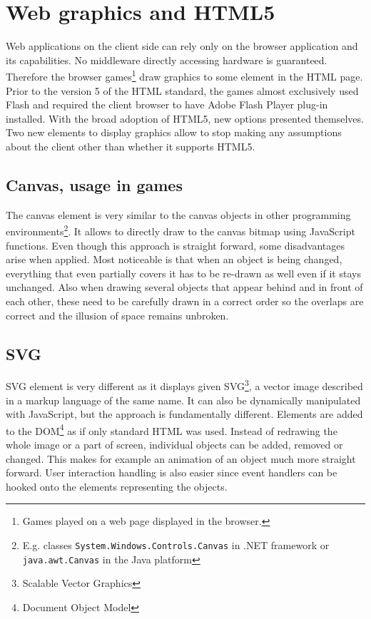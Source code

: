 \documentclass[11pt,oneside, final]{fithesis2}
\begin{document}
\section{Web graphics and HTML5}
Web applications on the client side can rely only on the browser application and its capabilities. No middleware directly accessing hardware is guaranteed. Therefore the browser games\footnote{Games played on a web page displayed in the browser.} draw graphics to some element in the HTML page. Prior to the version 5 of the HTML standard, the games almost exclusively used Flash and required the client browser to have Adobe Flash Player plug-in installed\cite{flashplayer}. With the broad adoption of HTML5, new options presented themselves. Two new elements to display graphics allow to stop making any assumptions about the client other than whether it supports HTML5.

\subsection{Canvas, usage in games}
The canvas element is very similar to the canvas objects in other programming environments\footnote{E.g. classes \texttt{System.Windows.Controls.Canvas} in .NET framework\cite{net_canvas} or \texttt{java.awt.Canvas} in the Java platform\cite{java_canvas}}. It allows to directly draw to the canvas bitmap using JavaScript functions. Even though this approach is straight forward, some disadvantages arise when applied. Most noticeable is that when an object is being changed, everything that even partially covers it has to be re-drawn as well even if it stays unchanged. Also when drawing several objects that appear behind and in front of each other, these need to be carefully drawn in a correct order so the overlaps are correct and the illusion of space remains unbroken.

\subsection{SVG}
SVG element is very different as it displays given SVG\footnote{Scalable Vector Graphics}, a vector image described in a markup language of the same name. It can also be dynamically manipulated with JavaScript, but the approach is fundamentally different. Elements are added to the DOM\footnote{Document Object Model} as if only standard HTML was used. Instead of redrawing the whole image or a part of screen, individual objects can be added, removed or changed. This makes for example an animation of an object much more straight forward. User interaction handling is also easier since event handlers can be hooked onto the elements representing the objects.
\end{document}
